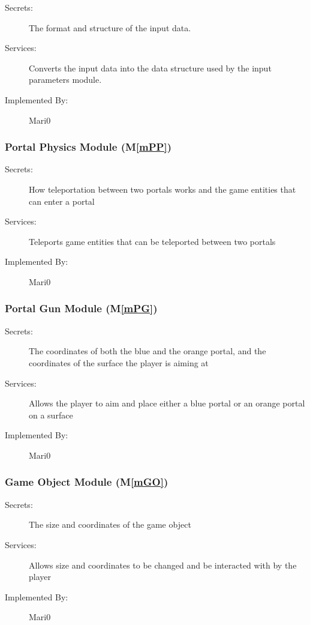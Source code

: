 \documentclass[12pt, titlepage]{article}
\newcommand{\mref}[1]{M\ref{#1}}
\begin{document}
\begin{description}
\item[Secrets:]The format and structure of the input data.
\item[Services:]Converts the input data into the data structure used by the
  input parameters module.
\item[Implemented By:] Mari0
\end{description}

\subsubsection{Portal Physics Module (\mref{mPP})}
\begin{description}
\item[Secrets:] How teleportation between two portals works and the game entities that can enter a portal
\item[Services:] Teleports game entities that can be teleported between two portals
\item[Implemented By:] Mari0
\end{description}

\subsubsection{Portal Gun Module (\mref{mPG})}
\begin{description}
\item[Secrets:] The coordinates of both the blue and the orange portal, and the coordinates of the surface the player is aiming at
\item[Services:] Allows the player to aim and place either a blue portal or an orange portal on a surface
\item[Implemented By:] Mari0
\end{description}

\subsubsection{Game Object Module (\mref{mGO})}
\begin{description}
\item[Secrets: ]The size and coordinates of the game object
\item[Services:]Allows size and coordinates to be changed and be interacted with by the player
\item[Implemented By:] Mari0
\end{description}
\end{document}
